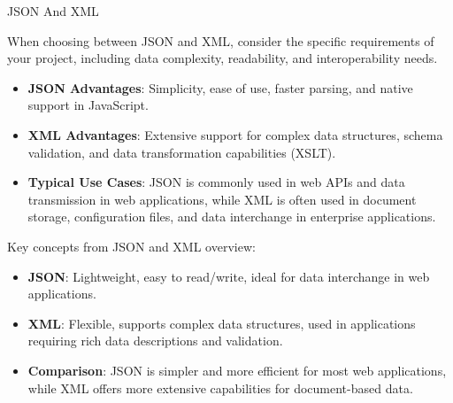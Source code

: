 \begin{notes}{JSON And XML}
    \begin{highlight}
    
        When choosing between JSON and XML, consider the specific requirements of your project, including data complexity, readability, and interoperability needs.
        
        \begin{itemize}
            \item \textbf{JSON Advantages}: Simplicity, ease of use, faster parsing, and native support in JavaScript.
            \item \textbf{XML Advantages}: Extensive support for complex data structures, schema validation, and data transformation capabilities (XSLT).
            \item \textbf{Typical Use Cases}: JSON is commonly used in web APIs and data transmission in web applications, while XML is often used in document storage, configuration files, and data 
            interchange in enterprise applications.
        \end{itemize}
    
    \end{highlight}
    
    \begin{highlight}
    
        Key concepts from JSON and XML overview:
        
        \begin{itemize}
            \item \textbf{JSON}: Lightweight, easy to read/write, ideal for data interchange in web applications.
            \item \textbf{XML}: Flexible, supports complex data structures, used in applications requiring rich data descriptions and validation.
            \item \textbf{Comparison}: JSON is simpler and more efficient for most web applications, while XML offers more extensive capabilities for document-based data.
        \end{itemize}
        
    \end{highlight}
\end{notes}